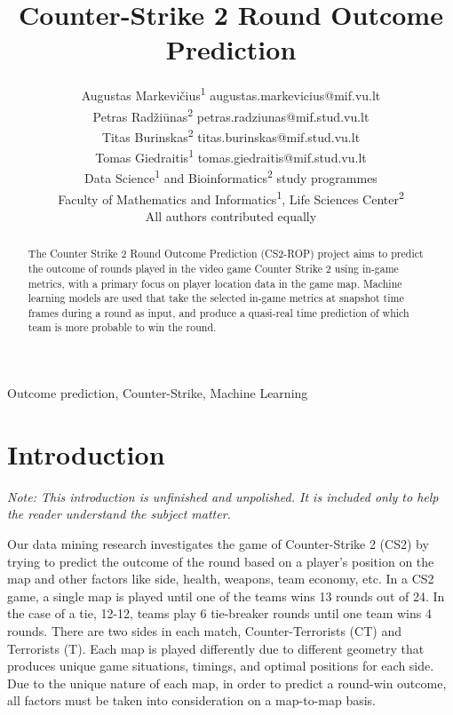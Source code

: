 \documentclass[twoside,11pt]{article}
\begin{document}
\title{Counter-Strike 2 Round Outcome Prediction}

\author{\noindent
  \name Augustas Markevičius\textsuperscript{1} \email augustas.markevicius@mif.vu.lt \\
  \name Petras Radžiūnas\textsuperscript{2} \email petras.radziunas@mif.stud.vu.lt \\
  \name Titas Burinskas\textsuperscript{2} \email titas.burinskas@mif.stud.vu.lt \\
  \name Tomas Giedraitis\textsuperscript{1} \email tomas.giedraitis@mif.stud.vu.lt \\
  \addr Data Science\textsuperscript{1} and Bioinformatics\textsuperscript{2} study programmes \\
  Faculty of Mathematics and Informatics\textsuperscript{1}, Life Sciences Center\textsuperscript{2} \\
  All authors contributed equally
}


\maketitle

\begin{abstract}%
The Counter Strike 2 Round Outcome Prediction (CS2-ROP) project aims to predict the outcome of
rounds played in the video game Counter Strike 2 using in-game metrics, with a primary focus on
player location data in the game map. Machine learning models are used that take the selected
in-game metrics at snapshot time frames during a round as input, and produce a quasi-real time
prediction of which team is more probable to win the round.
\end{abstract}

\begin{keywords}
  Outcome prediction, Counter-Strike, Machine Learning
\end{keywords}

\section{Introduction}

\textit{Note: This introduction is unfinished and unpolished. It is included only to help the reader
understand the subject matter.}

Our data mining research investigates the game of Counter-Strike 2 (CS2) by trying to predict the
outcome of the round based on a player's position on the map and other factors like side, health,
weapons, team economy, etc. In a CS2 game, a single map is played until one of the teams wins 13
rounds out of 24. In the case of a tie, 12-12, teams play 6 tie-breaker rounds until one team wins 4
rounds. There are two sides in each match, Counter-Terrorists (CT) and Terrorists (T). Each map is
played differently due to different geometry that produces unique game situations, timings, and
optimal positions for each side. Due to the unique nature of each map, in order to predict a
round-win outcome, all factors must be taken into consideration on a map-to-map basis.
\end{document}
